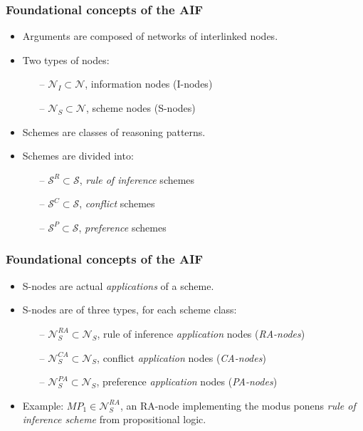 \documentclass{beamer}
\begin{document}
\begin{frame}
\frametitle{Foundational concepts of the AIF}
\begin{itemize}
\item Arguments are composed of networks of interlinked nodes. \pause
\item Two types of nodes: \pause
  \begin{itemize}
  \item[--] $\mathcal{N}_I \subset \mathcal{N}$, information nodes (I-nodes) \pause
  \item[--] $\mathcal{N}_S \subset \mathcal{N}$, scheme nodes (S-nodes)
  \end{itemize}
\item Schemes are classes of reasoning patterns. \pause
\item Schemes are divided into: \pause
  \begin{itemize}
  \item[--] $\mathcal{S}^R \subset \mathcal{S}$, \emph{rule of inference} schemes \pause
  \item[--] $\mathcal{S}^C \subset \mathcal{S}$, \emph{conflict} schemes \pause
  \item[--] $\mathcal{S}^P \subset \mathcal{S}$, \emph{preference} schemes
  \end{itemize}
\end{itemize}
\end{frame}

\begin{frame}
\frametitle{Foundational concepts of the AIF}
\begin{itemize}
\item S-nodes are actual \emph{applications} of a scheme. \pause
\item S-nodes are of three types, for each scheme class: \pause
  \begin{itemize}
  \item[--] $\mathcal{N}_S^{RA} \subset \mathcal{N}_S$, rule of inference \emph{application} nodes (\emph{RA-nodes}) \pause
  \item[--] $\mathcal{N}_S^{CA} \subset \mathcal{N}_S$, conflict \emph{application} nodes (\emph{CA-nodes}) \pause
  \item[--] $\mathcal{N}_S^{PA} \subset \mathcal{N}_S$, preference \emph{application} nodes (\emph{PA-nodes}) \pause
  \end{itemize}
\item Example: $MP_1 \in \mathcal{N}_S^{RA}$, an RA-node implementing the modus ponens \emph{rule of inference scheme} from propositional logic.
\end{itemize}
\end{frame}
\end{document}
